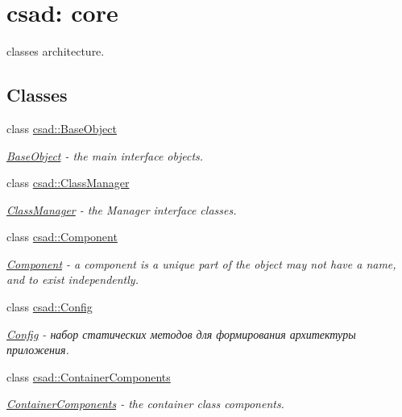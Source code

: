 \hypertarget{group__core}{\section{csad\-: core}
\label{group__core}
}


classes architecture.  


\subsection*{Classes}
\begin{DoxyCompactItemize}
\item 
class \hyperlink{classcsad_1_1_base_object}{csad\-::\-Base\-Object}
\begin{DoxyCompactList}\small\item\em \hyperlink{classcsad_1_1_base_object}{Base\-Object} -\/ the main interface objects. \end{DoxyCompactList}\item 
class \hyperlink{classcsad_1_1_class_manager}{csad\-::\-Class\-Manager}
\begin{DoxyCompactList}\small\item\em \hyperlink{classcsad_1_1_class_manager}{Class\-Manager} -\/ the Manager interface classes. \end{DoxyCompactList}\item 
class \hyperlink{classcsad_1_1_component}{csad\-::\-Component}
\begin{DoxyCompactList}\small\item\em \hyperlink{classcsad_1_1_component}{Component} -\/ a component is a unique part of the object may not have a name, and to exist independently. \end{DoxyCompactList}\item 
class \hyperlink{classcsad_1_1_config}{csad\-::\-Config}
\begin{DoxyCompactList}\small\item\em \hyperlink{classcsad_1_1_config}{Config} -\/ набор статических методов для формирования архитектуры приложения. \end{DoxyCompactList}\item 
class \hyperlink{classcsad_1_1_container_components}{csad\-::\-Container\-Components}
\begin{DoxyCompactList}\small\item\em \hyperlink{classcsad_1_1_container_components}{Container\-Components} -\/ the container class components. \end{DoxyCompactList}\item 

\end{DoxyCompactItemize}
